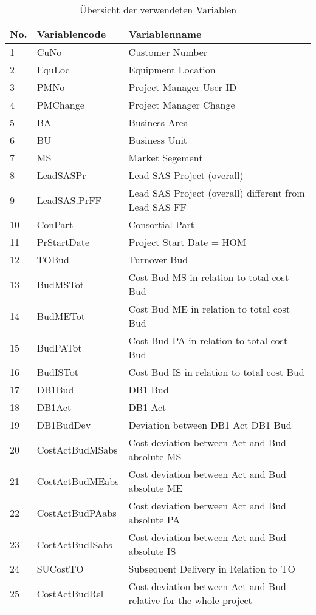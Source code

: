 \begin{longtable}[ht]{p{} p{}p{}}
	\caption{Übersicht der verwendeten Variablen}\\
		\textbf{No.} & \textbf{Variablencode} & \textbf{Variablenname} \\\hline\endhead
    1     & CuNo  & Customer Number \\
2     & EquLoc & Equipment Location \\
3     & PMNo  & Project Manager User ID \\
4     & PMChange & Project Manager Change \\
5     & BA    & Business Area \\
6     & BU    & Business Unit \\
7     & MS    & Market Segement \\
8     & LeadSASPr & Lead SAS Project (overall) \\
9     & LeadSAS.PrFF & Lead SAS Project (overall) different from Lead SAS FF \\
10    & ConPart & Consortial Part \\
11    & PrStartDate & Project Start Date = HOM \\
12    & TOBud & Turnover Bud \\
13    & BudMSTot & Cost Bud MS in relation to total cost Bud \\
14    & BudMETot & Cost Bud ME in relation to total cost Bud  \\
15    & BudPATot & Cost Bud PA in relation to total cost Bud \\
16    & BudISTot & Cost Bud IS in relation to total cost Bud \\
17    & DB1Bud & DB1 Bud \\
18    & DB1Act & DB1 Act \\
19    & DB1BudDev & Deviation between DB1 Act DB1 Bud \\
20    & CostActBudMSabs & Cost deviation between Act and Bud absolute MS \\
21    & CostActBudMEabs & Cost deviation between Act and Bud absolute ME \\
22    & CostActBudPAabs & Cost deviation between Act and Bud absolute PA \\
23    & CostActBudISabs & Cost deviation between Act and Bud absolute IS \\
24    & SUCostTO & Subsequent Delivery in Relation to TO \\
25    & CostActBudRel & Cost deviation between Act and Bud relative for the whole project \\

\end{longtable}
